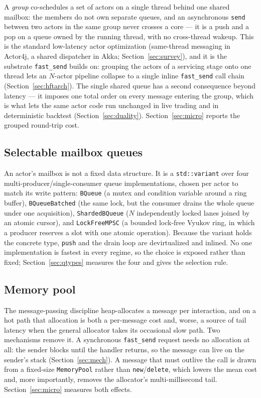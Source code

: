 \documentclass[11pt]{article}
\newcommand{\fs}{\texttt{fast\_send}}
\newcommand{\snd}{\texttt{send}}
\begin{document}
A \emph{group} co-schedules a set of actors on a single thread behind one shared
mailbox: the members do not own separate queues, and an asynchronous \snd{}
between two actors in the same group never crosses a core --- it is a push and a
pop on a queue owned by the running thread, with no cross-thread wakeup. This is
the standard low-latency actor optimization (same-thread messaging in Actor4j, a
shared dispatcher in Akka; Section~\ref{sec:survey}), and it is the substrate
\fs{} builds on: grouping the actors of a servicing stage onto one thread lets an
$N$-actor pipeline collapse to a single inline \fs{} call chain
(Section~\ref{sec:hftarch}). The single shared queue has a second consequence
beyond latency --- it imposes one total order on every message entering the
group, which is what lets the same actor code run unchanged in live trading and
in deterministic backtest (Section~\ref{sec:duality}).
Section~\ref{sec:micro} reports the grouped round-trip cost.

\subsection{Selectable mailbox queues}
\label{sec:queues-mech}

An actor's mailbox is not a fixed data structure. It is a \texttt{std::variant}
over four multi-producer/single-consumer queue implementations, chosen per actor
to match its write pattern: \texttt{BQueue} (a mutex and condition variable
around a ring buffer), \texttt{BQueueBatched} (the same lock, but the consumer
drains the whole queue under one acquisition), \texttt{ShardedBQueue} ($N$
independently locked lanes joined by an atomic cursor), and \texttt{LockFreeMPSC}
(a bounded lock-free Vyukov ring, in which a producer reserves a slot with one
atomic operation). Because the variant holds the concrete type, \texttt{push} and
the drain loop are devirtualized and inlined. No one implementation is fastest in
every regime, so the choice is exposed rather than fixed;
Section~\ref{sec:qtypes} measures the four and gives the selection rule.

\subsection{Memory pool}
\label{sec:pool}

The message-passing discipline heap-allocates a message per interaction, and on a
hot path that allocation is both a per-message cost and, worse, a source of tail
latency when the general allocator takes its occasional slow path. Two mechanisms
remove it. A synchronous \fs{} request needs no allocation at all: the sender
blocks until the handler returns, so the message can live on the sender's stack
(Section~\ref{sec:mech}). A message that must outlive the call is drawn from a
fixed-size \texttt{MemoryPool} rather than \texttt{new}/\texttt{delete}, which
lowers the mean cost and, more importantly, removes the allocator's
multi-millisecond tail. Section~\ref{sec:micro} measures both effects.
\end{document}
